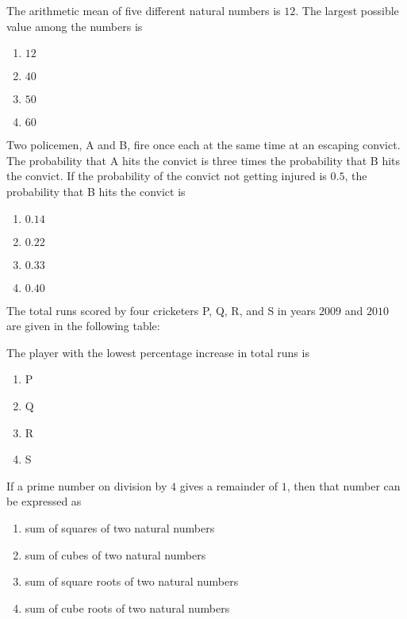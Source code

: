     \item The arithmetic mean of five different natural numbers is $12$. The largest possible value among the numbers is
    \begin{enumerate}
        \item $12$
        \item $40$
        \item $50$
        \item $60$
    \end{enumerate}

    \item Two policemen, A and B, fire once each at the same time at an escaping convict. The probability that A hits the convict is three times the probability that B hits the convict. If the probability of the convict not getting injured is $0.5$, the probability that B hits the convict is
    \begin{enumerate}
        \item $0.14$
        \item $0.22$
        \item $0.33$
        \item $0.40$
    \end{enumerate}

    \item The total runs scored by four cricketers P, Q, R, and S in years $2009$ and $2010$ are given in the following table:
    
    

    The player with the lowest percentage increase in total runs is
    \begin{enumerate}
        \item P
        \item Q
        \item R
        \item S
    \end{enumerate}

    \item If a prime number on division by $4$ gives a remainder of $1$, then that number can be expressed as
    \begin{enumerate}
        \item sum of squares of two natural numbers
        \item sum of cubes of two natural numbers
        \item sum of square roots of two natural numbers
        \item sum of cube roots of two natural numbers
    \end{enumerate}

